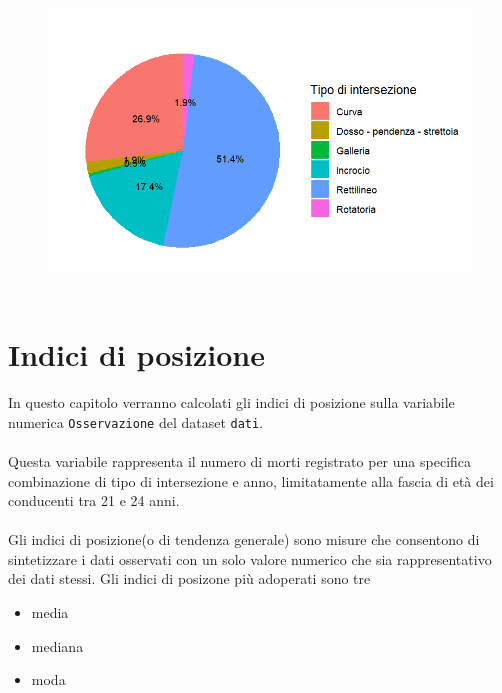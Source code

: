 \documentclass[14pt, openany, titlepage]{report} %
\begin{document}
\begin{figure}[H] %
    \centering
    \includegraphics[width=13cm, height=8cm]{Rplot08.png} %
\end{figure}



\chapter{Indici di posizione}
In questo capitolo verranno calcolati gli indici di posizione 
sulla variabile numerica \texttt{Osservazione} del dataset 
\texttt{dati}. \\\\
\noindent
Questa variabile rappresenta il numero di morti
 registrato per una specifica combinazione di tipo di intersezione 
 e anno, limitatamente alla fascia di età dei conducenti tra 21 e 24 
 anni. \\\\
 \noindent
 Gli indici di posizione(o di tendenza generale) sono misure che consentono di 
 sintetizzare i dati osservati con un solo valore numerico che sia rappresentativo dei dati stessi.
 Gli indici di posizone più adoperati sono tre
\begin{itemize}
  \item media
  \item mediana
  \item moda
\end{itemize}
\end{document}

